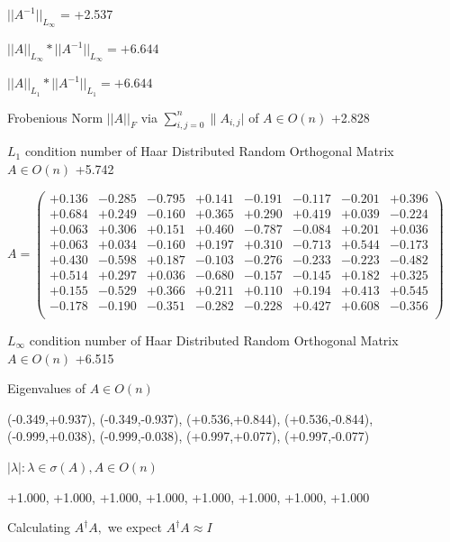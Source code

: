 \documentclass[9pt]{article}
\theoremstyle{plain}
\theoremstyle{definition}
\theoremstyle{remark}
\numberwithin{equation}{section}
\begin{document}
$||A^{-1}||_{L_{\infty}}$ = +2.537

$||A||_{L_{\infty}} * ||A^{-1}||_{L_{\infty}} = +6.644$

$||A||_{L_1} * ||A^{-1}||_{L_1} = +6.644$

Frobenious Norm  $||A||_{\textit{F}}$ via $\sum\limits_{i,j =0}^{n} \|A_{i,j}|$   of  $A \in O(n)$  +2.828

$L_1$ condition number of Haar Distributed Random Orthogonal Matrix $A \in O(n)$ +5.742

$A = \left(
\begin{array}{
cccccccc}
+0.136 & -0.285 & -0.795 & +0.141 & -0.191 & -0.117 & -0.201 & +0.396 \\
+0.684 & +0.249 & -0.160 & +0.365 & +0.290 & +0.419 & +0.039 & -0.224 \\
+0.063 & +0.306 & +0.151 & +0.460 & -0.787 & -0.084 & +0.201 & +0.036 \\
+0.063 & +0.034 & -0.160 & +0.197 & +0.310 & -0.713 & +0.544 & -0.173 \\
+0.430 & -0.598 & +0.187 & -0.103 & -0.276 & -0.233 & -0.223 & -0.482 \\
+0.514 & +0.297 & +0.036 & -0.680 & -0.157 & -0.145 & +0.182 & +0.325 \\
+0.155 & -0.529 & +0.366 & +0.211 & +0.110 & +0.194 & +0.413 & +0.545 \\
-0.178 & -0.190 & -0.351 & -0.282 & -0.228 & +0.427 & +0.608 & -0.356 \\
\end{array}
\right)$ \newline 

$L_{\infty}$ condition number of Haar Distributed Random Orthogonal Matrix $A \in O(n)$ +6.515

Eigenvalues of $A \in O(n)$

(-0.349,+0.937), (-0.349,-0.937), (+0.536,+0.844), (+0.536,-0.844), (-0.999,+0.038), (-0.999,-0.038), (+0.997,+0.077), (+0.997,-0.077)

 $|\lambda | : \lambda \in \sigma(A) , A \in O(n)$

+1.000, +1.000, +1.000, +1.000, +1.000, +1.000, +1.000, +1.000


Calculating $A^{\dag} A,$  we expect $A^{\dag} A \approx I$
\end{document}
